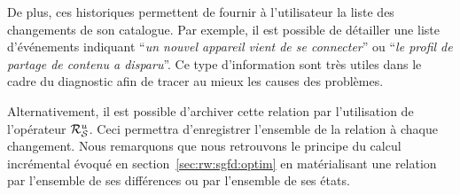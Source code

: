 De plus, ces historiques permettent de fournir à l'utilisateur la liste des changements de son catalogue. Par exemple, il est possible de détailler une liste d'événements indiquant \enquote{\it un nouvel appareil vient de se connecter} ou \enquote{\it le profil de partage de contenu a disparu}. Ce type d'information sont très utiles dans le cadre du diagnostic afin de tracer au mieux les causes des problèmes.

Alternativement, il est possible d'archiver cette relation par l'utilisation de l'opérateur $\mathcal{R}_{\mathcal S}^{u}$. Ceci permettra d'enregistrer l'ensemble de la relation à chaque changement. Nous remarquons que nous retrouvons le principe du calcul incrémental évoqué en section~\ref{sec:rw:sgfd:optim} en matérialisant une relation par l'ensemble de ses différences ou par l'ensemble de ses états.